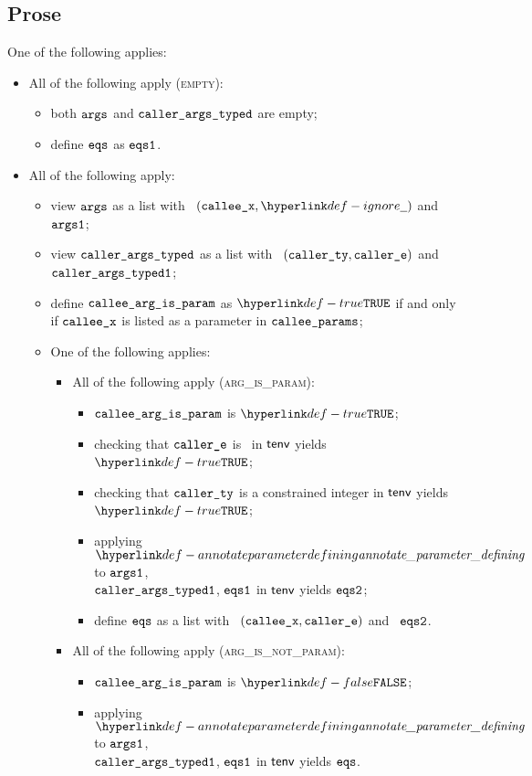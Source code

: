 \subsection{Prose}
One of the following applies:
\begin{itemize}
  \item All of the following apply (\textsc{empty}):
  \begin{itemize}
    \item both $\texttt{args}$ and $\texttt{caller\_args\_typed}$ are empty;
    \item define $\texttt{eqs}$ as $\texttt{eqs1}$.
  \end{itemize}

  \item All of the following apply:
  \begin{itemize}
    \item view $\texttt{args}$ as a list with \head\ $(\calleex, \Ignore)$ and \tail\ $\texttt{args1}$;
    \item view $\texttt{caller\_args\_typed}$ as a list with \head\ $(\texttt{caller\_ty}, \texttt{caller\_e})$ and \tail\ $\texttt{caller\_args\_typed1}$;
    \item define $\texttt{callee\_arg\_is\_param}$ as $\True$ if and only if $\texttt{callee\_x}$ is listed as a parameter in $\texttt{callee\_params}$;
    \item One of the following applies:
    \begin{itemize}
      \item All of the following apply (\textsc{arg\_is\_param}):
      \begin{itemize}
        \item $\texttt{callee\_arg\_is\_param}$ is $\True$;
        \item checking that $\texttt{caller\_e}$ is \staticallyevaluable\ in $\textsf{tenv}$ yields $\True$\ProseOrTypeError;
        \item checking that $\texttt{caller\_ty}$ is a constrained integer in $\textsf{tenv}$ yields \\
              $\True$\ProseOrTypeError;
        \item applying $\annotateparameterdefining$ to $\texttt{args1}$, \\
              $\texttt{caller\_args\_typed1}$, $\texttt{eqs1}$ in $\textsf{tenv}$ yields $\texttt{eqs2}$\ProseOrTypeError;
        \item define $\texttt{eqs}$ as a list with \head\ $(\texttt{callee\_x}, \texttt{caller\_e})$ and \tail\ $\texttt{eqs2}$.
      \end{itemize}

      \item All of the following apply (\textsc{arg\_is\_not\_param}):
      \begin{itemize}
        \item $\texttt{callee\_arg\_is\_param}$ is $\False$;
        \item applying $\annotateparameterdefining$ to $\texttt{args1}$, \\
              $\texttt{caller\_args\_typed1}$, $\texttt{eqs1}$ in $\textsf{tenv}$ yields $\texttt{eqs}$\ProseOrTypeError.
      \end{itemize}
    \end{itemize}
  \end{itemize}
\end{itemize}

